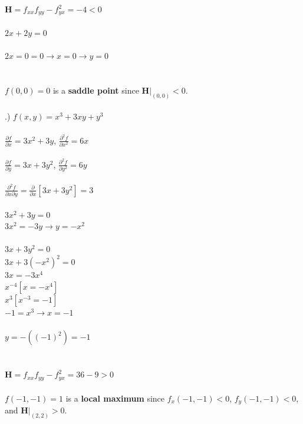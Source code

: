\documentclass[12pt]{article}
\begin{document}
\noindent $\mathbf{H} = f_{xx}f_{yy} - f_{yx}^{2} = -4 < 0$\\\\
\noindent $2x+2y = 0$\\\\
\noindent $2x=0= 0 \rightarrow x = 0 \rightarrow y = 0$\\\\\\
\noindent $f(0, 0) = 0$ is a \textbf{saddle point} since $\mathbf{H}\Big|_{(0,0)} < 0$.\\\\
.) $f(x,y) = x^{3}+3xy + y^{3}$\\\\
\noindent $\frac{\partial f}{\partial x} = 3x^{2} + 3y$, \hspace{10pt} $\frac{\partial ^{2} f}{\partial x^{2}} = 6x$\\\\
\noindent $\frac{\partial f}{\partial y} = 3x + 3y^{2}$, \hspace{10pt} $\frac{\partial ^{2} f}{\partial y^{2}} = 6y$\\\\
\noindent $\frac{\partial^{2} f}{\partial x \partial y } = \frac{\partial }{\partial x}[3x + 3y^{2}] = 3$\\\\
\noindent $3x^{2} + 3y = 0 $\\
\noindent $3x^{2} = -3y \rightarrow y = -x^{2}$\\\\
\noindent $3x + 3y^{2} = 0$\\
\noindent $3x + 3(-x^{2})^{2} = 0$\\
\noindent $3x = -3x^{4}$\\
\noindent $x^{-4}[x = -x^{4}]$\\
\noindent $x^{3}[x^{-3} = -1]$\\
\noindent $-1 = x^{3} \rightarrow x = -1$\\\\
\noindent $y = -((-1)^{2}) = -1$\\\\\\
\noindent $\mathbf{H} = f_{xx}f_{yy} - f_{yx}^{2} = 36 - 9 > 0$\\\\
\noindent $f(-1, -1) = 1$ is a \textbf{local maximum} since $f_{x}(-1, -1) < 0$, $f_{y}(-1, -1) < 0$, and $\mathbf{H}\Big|_{(2,2)} > 0$.\\\\
\end{document}
